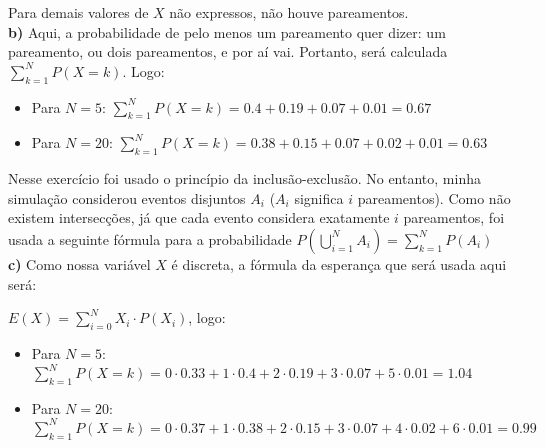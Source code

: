 \documentclass[12pt,letterpaper]{article}
\begin{document}
	Para demais valores de $X$ não expressos, não houve pareamentos. \\
	
	\textbf{b)} Aqui, a probabilidade de pelo menos um pareamento quer dizer: um pareamento, ou dois pareamentos, e por aí vai. Portanto, será calculada $\sum_{k=1}^{N} P(X=k)$. Logo:
	
	\begin{itemize}
		\item Para $N = 5$: $\sum_{k=1}^{N} P(X=k) = 0.4 + 0.19 + 0.07 + 0.01 = 0.67$
		\item Para $N = 20$: $\sum_{k=1}^{N} P(X=k) = 0.38 + 0.15 + 0.07 + 0.02 + 0.01 = 0.63$
	\end{itemize}
	
	Nesse exercício foi usado o princípio da inclusão-exclusão. No entanto, minha simulação considerou eventos disjuntos $A_i$ ($A_i$ significa $i$ pareamentos). Como não existem intersecções, já que cada evento considera exatamente $i$ pareamentos, foi usada a seguinte fórmula para a probabilidade $P(\bigcup_{i=1}^N A_i) = \sum_{k=1}^{N} P(A_i)$ \\
	
	\textbf{c)} Como nossa variável $X$ é discreta, a fórmula da esperança que será usada aqui será: 
	
	\begin{center}
		$E(X) = \sum_{i=0}^{N} X_i \cdot P(X_i)$, logo:
	\end{center}
	
	\begin{itemize}
		\item Para $N = 5$: $\sum_{k=1}^{N} P(X=k) = 0 \cdot 0.33 + 1 \cdot 0.4 + 2 \cdot 0.19 + 3 \cdot 0.07 + 5 \cdot 0.01 = 1.04$
		\item Para $N = 20$: $\sum_{k=1}^{N} P(X=k) = 0 \cdot 0.37 + 1 \cdot 0.38 + 2 \cdot 0.15 + 3 \cdot 0.07 + 4 \cdot 0.02 + 6 \cdot 0.01 = 0.99$
	\end{itemize}
	
\end{document}
